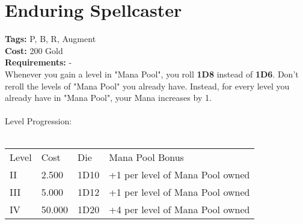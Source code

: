 \section{Enduring Spellcaster}\label{sec:enduringspellcaster}
\textbf{Tags:} P, B, R, Augment\\
\textbf{Cost:} 200 Gold\\
\textbf{Requirements:} -\\
Whenever you gain a level in "Mana Pool", you roll \textbf{1D8} instead of \textbf{1D6}.
Don't reroll the levels of "Mana Pool" you already have.
Instead, for every level you already have in "Mana Pool", your Mana increases by 1.\\
\\
Level Progression:\\
\\
\begin{tabular}{l | l | l | l}
    Level & Cost & Die & Mana Pool Bonus\\
    II & 2.500 & 1D10 & +1 per level of Mana Pool owned\\
    III & 5.000 & 1D12 & +1 per level of Mana Pool owned\\
    IV & 50.000 & 1D20 & +4 per level of Mana Pool owned\\
\end{tabular}